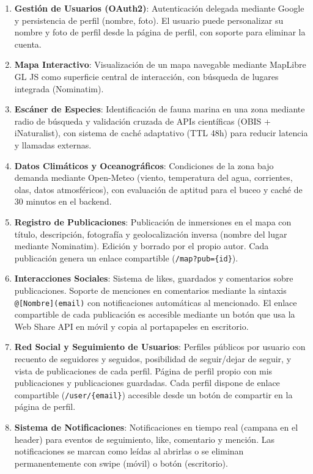 \begin{enumerate}
    \item \textbf{Gestión de Usuarios (OAuth2)}: Autenticación delegada mediante Google y persistencia de perfil (nombre, foto). El usuario puede personalizar su nombre y foto de perfil desde la página de perfil, con soporte para eliminar la cuenta.
    \item \textbf{Mapa Interactivo}: Visualización de un mapa navegable mediante MapLibre GL JS como superficie central de interacción, con búsqueda de lugares integrada (Nominatim).
    \item \textbf{Escáner de Especies}: Identificación de fauna marina en una zona mediante radio de búsqueda y validación cruzada de APIs científicas (OBIS + iNaturalist), con sistema de caché adaptativo (TTL 48h) para reducir latencia y llamadas externas.
    \item \textbf{Datos Climáticos y Oceanográficos}: Condiciones de la zona bajo demanda mediante Open-Meteo (viento, temperatura del agua, corrientes, olas, datos atmosféricos), con evaluación de aptitud para el buceo y caché de 30 minutos en el backend.
    \item \textbf{Registro de Publicaciones}: Publicación de inmersiones en el mapa con título, descripción, fotografía y geolocalización inversa (nombre del lugar mediante Nominatim). Edición y borrado por el propio autor. Cada publicación genera un enlace compartible (\texttt{/map?pub=\{id\}}).
    \item \textbf{Interacciones Sociales}: Sistema de likes, guardados y comentarios sobre publicaciones. Soporte de menciones en comentarios mediante la sintaxis \texttt{@[Nombre](email)} con notificaciones automáticas al mencionado. El enlace compartible de cada publicación es accesible mediante un botón que usa la Web Share API en móvil y copia al portapapeles en escritorio.
    \item \textbf{Red Social y Seguimiento de Usuarios}: Perfiles públicos por usuario con recuento de seguidores y seguidos, posibilidad de seguir/dejar de seguir, y vista de publicaciones de cada perfil. Página de perfil propio con mis publicaciones y publicaciones guardadas. Cada perfil dispone de enlace compartible (\texttt{/user/\{email\}}) accesible desde un botón de compartir en la página de perfil.
    \item \textbf{Sistema de Notificaciones}: Notificaciones en tiempo real (campana en el header) para eventos de seguimiento, like, comentario y mención. Las notificaciones se marcan como leídas al abrirlas o se eliminan permanentemente con swipe (móvil) o botón (escritorio).
\end{enumerate}


